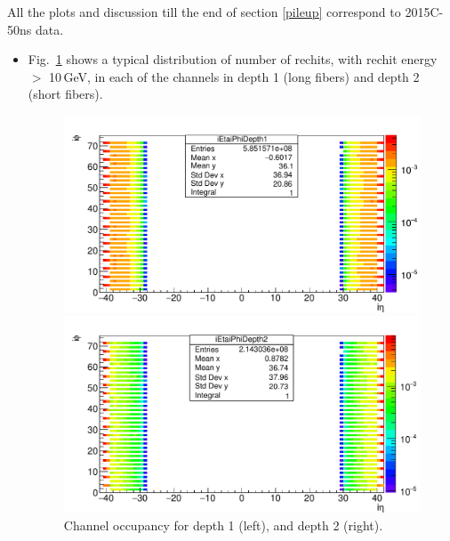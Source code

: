 All the plots and discussion till the end of section \ref{pileup} correspond to 2015C-50ns data.
\begin{itemize}
\item Fig.~\ref{fig:254833_ietavsIphiD1D2} shows a typical distribution of number of rechits, with rechit energy $>$ 10\,GeV, in each of the channels in depth 1 (long fibers) and depth 2 (short fibers). 
\begin{figure}[h!]
\begin{minipage}[b]{0.5\linewidth}
\centering
\includegraphics[width=.99\linewidth]{../Figures/Chap2/ImageFiles_HF/BasicPics/254833_ietavsIphiD1.pdf}
\end{minipage}
\begin{minipage}[b]{0.5\linewidth}
\includegraphics[width=0.99\linewidth]{../Figures/Chap2/ImageFiles_HF/BasicPics/254833_ietavsIphiD2.pdf}
\end{minipage}
\caption{Channel occupancy for depth 1 (left), and depth 2 (right).}
\label{fig:254833_ietavsIphiD1D2}
\end{figure}


\end{itemize}

